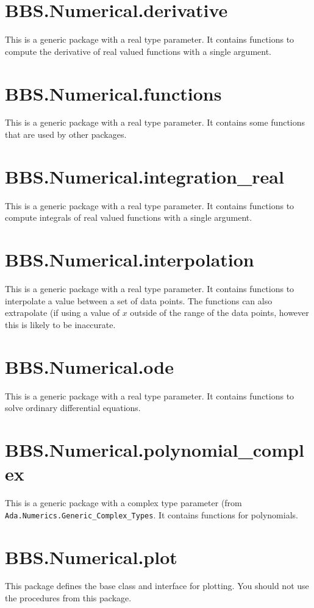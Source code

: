\documentclass[10pt, openany]{book}
\newcommand{\package}[1]{\texttt{#1}}
\begin{document}
\section{BBS.Numerical.derivative}
This is a generic package with a real type parameter.  It contains functions to compute the derivative of real valued functions with a single argument.

\section{BBS.Numerical.functions}
This is a generic package with a real type parameter.  It contains some functions that are used by other packages.

\section{BBS.Numerical.integration\_real}
This is a generic package with a real type parameter.  It contains functions to compute integrals of real valued functions with a single argument.

\section{BBS.Numerical.interpolation}
This is a generic package with a real type parameter.  It contains functions to interpolate a value between a set of data points.  The functions can also extrapolate (if using a value of $x$ outside of the range of the data points, however this is likely to be inaccurate.

\section{BBS.Numerical.ode}
This is a generic package with a real type parameter.  It contains functions to solve ordinary differential equations.

\section{BBS.Numerical.polynomial\_complex}
This is a generic package with a complex type parameter (from \package{Ada.Numerics.Generic\_Complex\_Types}.  It contains functions for polynomials.

\section{BBS.Numerical.plot}
This package defines the base class and interface for plotting.  You should not use the procedures from this package.
\end{document}
